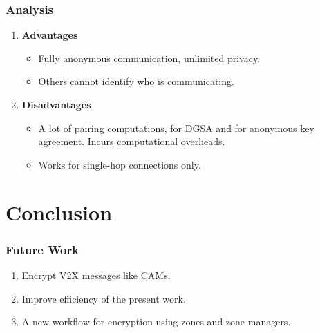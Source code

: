 \documentclass{beamer}
\begin{document}
    \begin{frame}
        \frametitle{Analysis}
        \begin{enumerate}
            \item<1-> \textbf{Advantages}
            \begin{itemize}
                \item Fully anonymous communication, unlimited privacy.
                \item Others cannot identify who is communicating.
            \end{itemize}
            \item<2-> \textbf{Disadvantages}
            \begin{itemize}
                \item A lot of pairing computations, for DGSA and for anonymous
                key agreement. Incurs computational overheads.
                \item Works for single-hop connections only.
            \end{itemize}
        \end{enumerate}
    \end{frame}

    \section{Conclusion}
    \begin{frame}
        \frametitle{Future Work}
        \begin{enumerate}
            \item Encrypt V2X messages like CAMs.
            \item Improve efficiency of the present work.
            \item A new workflow for encryption using zones and zone managers.
        \end{enumerate}
    \end{frame}
\end{document}
